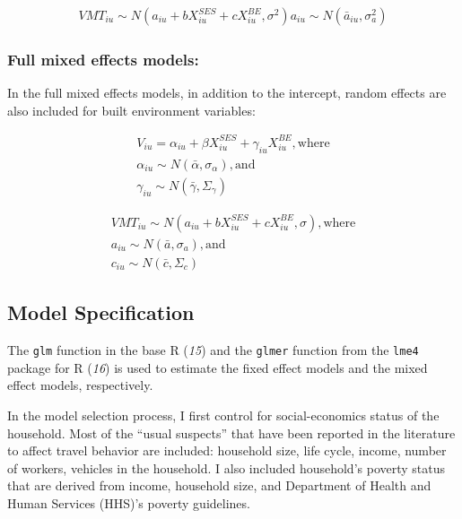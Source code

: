 \documentclass[numbered]{trbunofficial}
\begin{document}
\begin{equation}
\label{eq:mixed0-step2}
\begin{split}
VMT_{iu} \sim N(a_{iu} + b X_{iu}^{SES} + c X_{iu}^{BE}, \sigma^2)
a_{iu} \sim N(\bar{a}_{iu}, \sigma_{a}^2)
\end{split}
\end{equation}

\hypertarget{full-mixed-effects-models}{%
\subsubsection{Full mixed effects models:}\label{full-mixed-effects-models}}

In the full mixed effects models, in addition to the intercept, random effects are also included for built environment variables:

\begin{equation}
\label{eq:mixed1-step1}
\begin{split}
V_{iu} = \alpha_{iu} + \beta X_{iu}^{SES} + \gamma_{iu} X_{iu}^{BE}, \text{where} \\
\alpha_{iu} \sim N(\bar{\alpha}, \sigma_{\alpha}), \text{and} \\
\gamma_{iu} \sim N(\bar{\gamma}, \Sigma_{\gamma})
\end{split}
\end{equation}

\begin{equation}
\label{eq:mixed1-step2}
\begin{split}
VMT_{iu} \sim N(a_{iu} + b X_{iu}^{SES} + c X_{iu}^{BE}, \sigma), \text{where} \\
a_{iu} \sim N(\bar{a}, \sigma_{a}), \text{and} \\
c_{iu} \sim N(\bar{c}, \Sigma_{c})
\end{split}
\end{equation}

\hypertarget{model-specification}{%
\subsection{Model Specification}\label{model-specification}}

The \texttt{glm} function in the base R (\emph{15}) and the \texttt{glmer} function from the \texttt{lme4} package for R (\emph{16}) is used to estimate the fixed effect models and the mixed effect models, respectively.

In the model selection process, I first control for social-economics status of the household. Most of the ``usual suspects'' that have been reported in the literature to affect travel behavior are included: household size, life cycle, income, number of workers, vehicles in the household. I also included household's poverty status that are derived from income, household size, and Department of Health and Human Services (HHS)'s poverty guidelines.
\end{document}
